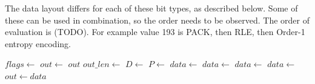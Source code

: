 \documentclass[a4paper]{article}
\begin{document}
The data layout differs for each of these bit types, as described
below.  Some of these can be used in combination, so the order needs
to be observed.  The order of evaluation is (TODO).  For example value
193 is PACK, then RLE, then Order-1 entropy encoding.

\begin{algorithmic}[1]
  \State $flags \gets $
   
    \State $out \gets $
    \Return $out$
  \EndIf{}
  \Statex
   
    \State $out\_len \gets$
  \EndIf
   
    \State $D \gets $
  \EndIf
   
    \State $P \gets $
  \EndIf
   
    \State $data \gets $
  \EndIf
   
     
      \State $data \gets $
    \Else
      \State $data \gets $
    \EndIf
  \EndIf
   
    \State $data \gets $
  \EndIf
  \State $out \gets data$ 
  \EndFunction
\end{algorithmic}
\end{document}

